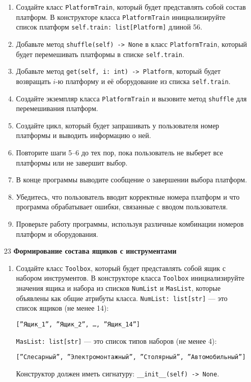 \begin{enumerate}
\begin{enumerate}
    \item Создайте класс \texttt{PlatformTrain}, который будет представлять собой состав платформ. В конструкторе класса \texttt{PlatformTrain} инициализируйте список платформ \texttt{self.train: list[Platform]} длиной 56.

    \item Добавьте метод \texttt{shuffle(self) -> None} в класс \texttt{PlatformTrain}, который будет перемешивать платформы в списке \texttt{self.train}.

    \item Добавьте метод \texttt{get(self, i: int) -> Platform}, который будет возвращать $i$-ю платформу и её оборудование из списка \texttt{self.train}.

    \item Создайте экземпляр класса \texttt{PlatformTrain} и вызовите метод \texttt{shuffle} для перемешивания платформ.

    \item Создайте цикл, который будет запрашивать у пользователя номер платформы и выводить информацию о ней.

    \item Повторите шаги 5–6 до тех пор, пока пользователь не выберет все платформы или не завершит выбор.

    \item В конце программы выводите сообщение о завершении выбора платформ.

    \item Убедитесь, что пользователь вводит корректные номера платформ и что программа обрабатывает ошибки, связанные с вводом пользователя.

    \item Проверьте работу программы, используя различные комбинации номеров платформ и оборудования.
\end{enumerate}

\item[23] \textbf{Формирование состава ящиков с инструментами}
\begin{enumerate}
    \item Создайте класс \texttt{Toolbox}, который будет представлять собой ящик с набором инструментов. В конструкторе класса \texttt{Toolbox} инициализируйте значения ящика и набора из списков \texttt{NumList} и \texttt{MasList}, которые объявлены как общие атрибуты класса. \texttt{NumList: list[str]} — это список ящиков (не менее 14): 
    \begin{center}
        \texttt{[''Ящик\_1'', ''Ящик\_2'', \dots, ''Ящик\_14'']}
    \end{center}
    \texttt{MasList: list[str]} — это список типов наборов (не менее 4):
    \begin{center}
        \texttt{[''Слесарный'', ''Электромонтажный'', ''Столярный'', ''Автомобильный'']}
    \end{center}
    Конструктор должен иметь сигнатуру: \texttt{\_\_init\_\_(self) -> None}.


\end{enumerate}
\end{enumerate}
